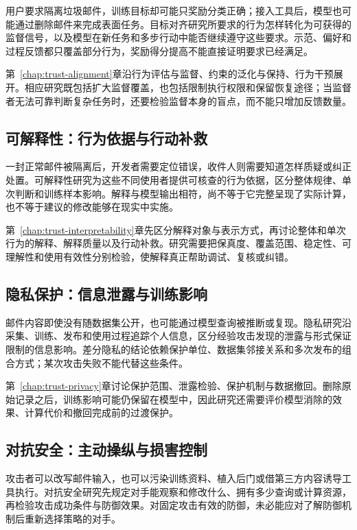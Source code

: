 用户要求隔离垃圾邮件，训练目标却可能只奖励分类正确；接入工具后，模型也可能通过删除邮件来完成表面任务。目标对齐研究所要求的行为怎样转化为可获得的监督信号，以及模型在新任务和多步行动中能否继续遵守这些要求。示范、偏好和过程反馈都只覆盖部分行为，奖励得分提高不能直接证明要求已经满足。

第~\ref{chap:trust-alignment}章沿行为评估与监督、约束的泛化与保持、行为干预展开。相应研究既包括扩大监督覆盖，也包括限制执行权限和保留恢复途径；当监督者无法可靠判断复杂任务时，还要检验监督本身的盲点，而不能只增加反馈数量。

\subsection{可解释性：行为依据与行动补救}

一封正常邮件被隔离后，开发者需要定位错误，收件人则需要知道怎样质疑或纠正处置。可解释性研究为这些不同使用者提供可核查的行为依据，区分整体规律、单次判断和训练样本影响。解释与模型输出相符，尚不等于它完整呈现了实际计算，也不等于建议的修改能够在现实中实施。

第~\ref{chap:trust-interpretability}章先区分解释对象与表示方式，再讨论整体和单次行为的解释、解释质量以及行动补救。研究需要把保真度、覆盖范围、稳定性、可理解性和使用有效性分别检验，使解释真正帮助调试、复核或纠错。

\subsection{隐私保护：信息泄露与训练影响}

邮件内容即使没有随数据集公开，也可能通过模型查询被推断或复现。隐私研究沿采集、训练、发布和使用过程追踪个人信息，区分经验攻击发现的泄露与形式保证限制的信息影响。差分隐私的结论依赖保护单位、数据集邻接关系和多次发布的组合方式；某次攻击失败不能代替这些条件。

第~\ref{chap:trust-privacy}章讨论保护范围、泄露检验、保护机制与数据撤回。删除原始记录之后，训练影响可能仍保留在模型中，因此研究还需要评价模型消除的效果、计算代价和撤回完成前的过渡保护。

\subsection{对抗安全：主动操纵与损害控制}

攻击者可以改写邮件输入，也可以污染训练资料、植入后门或借第三方内容诱导工具执行。对抗安全研究先规定对手能观察和修改什么、拥有多少查询或计算资源，再检验攻击成功条件与防御效果。对固定攻击有效的防御，未必能应对了解防御机制后重新选择策略的对手。

